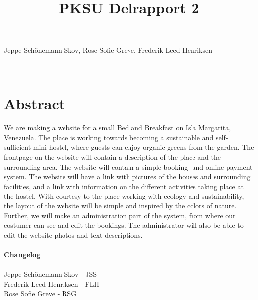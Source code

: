 \documentclass[12pt,a4paper]{article}
\begin{document}
\title{PKSU Delrapport 2}
\maketitle
\begin{center}
Jeppe Schönemann Skov, Rose Sofie Greve, Frederik Leed Henriksen \\ \hfill \\ \hfill \\ 
\end{center}
\newpage
\tableofcontents
\newpage
\section{Abstract}
We are making a website for a small Bed and Breakfast on Isla Margarita, Venezuela. The place is working towards becoming a sustainable and self-sufficient mini-hostel, where guests can enjoy organic greens from the garden.
The frontpage on the website will contain a description of the place and the surrounding area.
The website will contain a simple booking- and online payment system.
The website will have a link with pictures of the houses and surrounding facilities, and a link with information on the different activities taking place at the hostel.
With courtesy to the place working with ecology and sustainability, the layout of the website will be simple and inspired by the colors of nature.
Further, we will make an administration part of the system, from where our costumer can see and edit the bookings. The administrator will also be able to edit the website photos and text descriptions. \\\\
\textbf{Changelog}\\\\
Jeppe Schönemann Skov - JSS\\
Frederik Leed Henriksen - FLH\\
Rose Sofie Greve - RSG\\
\end{document}
